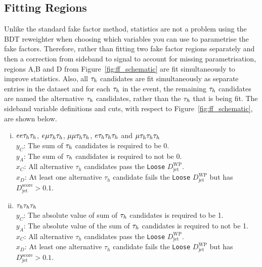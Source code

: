 \subsection{Fitting Regions}

Unlike the standard fake factor method, statistics are not a problem using the BDT reweighter when choosing which variables you can use to parametrise the fake factors. 
Therefore, rather than fitting two fake factor regions separately and then a correction from sideband to signal to account for missing parametrisation, regions A,B and D from Figure~\ref{fig:ff_schematic} are fit simultaneously to improve statistics. 
Also, all $\tau_{h}$ candidates are fit simultaneously as separate entries in the dataset and for each $\tau_{h}$ in the event, the remaining $\tau_{h}$ candidates are named the alternative $\tau_{h}$ candidates, rather than the $\tau_{h}$ that is being fit. 
The sideband variable definitions and cuts, with respect to Figure~\ref{fig:ff_schematic}, are shown below. \\

\begin{enumerate}[i)]
   \item $ee\tau_{h}\tau_{h}$, $e\mu\tau_{h}\tau_{h}$, $\mu\mu\tau_{h}\tau_{h}$, $e\tau_{h}\tau_{h}\tau_{h}$ and $\mu\tau_{h}\tau_{h}\tau_{h}$  \\
     \indent $y_C$: The sum of $\tau_{h}$ candidates is required to be 0. \\
     \indent $y_A$: The sum of $\tau_{h}$ candidates is required to not be 0. \\
     \indent $x_C$: All alternative $\tau_h$ candidates pass the \texttt{Loose} $D_{\text{jet}}^{\text{WP}}$. \\
     \indent $x_D$: At least one alternative $\tau_h$ candidate fails the \texttt{Loose} $D_{\text{jet}}^{\text{WP}}$ but has $D_{\text{jet}}^{\text{score}} > 0.1$.
  \item $\tau_{h}\tau_{h}\tau_{h}$ \\
     \indent $y_C$: The absolute value of sum of $\tau_{h}$ candidates is required to be 1. \\
     \indent $y_A$: The absolute value of the sum of $\tau_{h}$ candidates is required to not be 1. \\
     \indent $x_C$: All alternative $\tau_h$ candidates pass the \texttt{Loose} $D_{\text{jet}}^{\text{WP}}$. \\
     \indent $x_D$: At least one alternative $\tau_h$ candidate fails the \texttt{Loose} $D_{\text{jet}}^{\text{WP}}$ but has $D_{\text{jet}}^{\text{score}} > 0.1$.
\end{enumerate}

